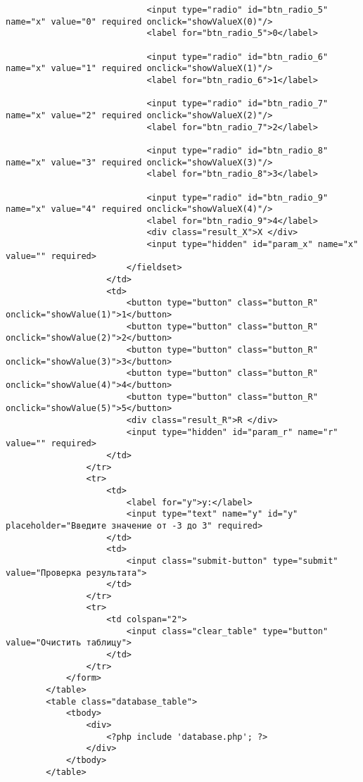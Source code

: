 \documentclass{article}
\begin{document}
\begin{verbatim}
                            <input type="radio" id="btn_radio_5" name="x" value="0" required onclick="showValueX(0)"/>
                            <label for="btn_radio_5">0</label>

                            <input type="radio" id="btn_radio_6" name="x" value="1" required onclick="showValueX(1)"/>
                            <label for="btn_radio_6">1</label>

                            <input type="radio" id="btn_radio_7" name="x" value="2" required onclick="showValueX(2)"/>
                            <label for="btn_radio_7">2</label>

                            <input type="radio" id="btn_radio_8" name="x" value="3" required onclick="showValueX(3)"/>
                            <label for="btn_radio_8">3</label>

                            <input type="radio" id="btn_radio_9" name="x" value="4" required onclick="showValueX(4)"/>
                            <label for="btn_radio_9">4</label>
                            <div class="result_X">X </div>
                            <input type="hidden" id="param_x" name="x" value="" required>
                        </fieldset>
                    </td>
                    <td>
                        <button type="button" class="button_R" onclick="showValue(1)">1</button>
                        <button type="button" class="button_R" onclick="showValue(2)">2</button>
                        <button type="button" class="button_R" onclick="showValue(3)">3</button>
                        <button type="button" class="button_R" onclick="showValue(4)">4</button>
                        <button type="button" class="button_R" onclick="showValue(5)">5</button>
                        <div class="result_R">R </div>
                        <input type="hidden" id="param_r" name="r" value="" required>
                    </td>
                </tr>
                <tr>
                    <td>
                        <label for="y">y:</label>
                        <input type="text" name="y" id="y" placeholder="Введите значение от -3 до 3" required>
                    </td>
                    <td>
                        <input class="submit-button" type="submit" value="Проверка результата">
                    </td>
                </tr>
                <tr>
                    <td colspan="2">
                        <input class="clear_table" type="button" value="Очистить таблицу">
                    </td>
                </tr>
            </form>
        </table>
        <table class="database_table">
            <tbody>
                <div>
                    <?php include 'database.php'; ?>
                </div>
            </tbody>
        </table>


\end{verbatim}
\end{document}
